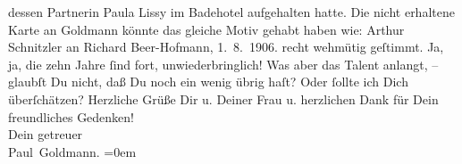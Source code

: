 \begin{ledgroupsized}[t]{13cm}
{{{                  dessen Partnerin Paula Lissy im Badehotel aufgehalten hatte. Die nicht
                  erhaltene Karte an Goldmann könnte das
                  gleiche Motiv gehabt haben wie: Arthur Schnitzler an Richard Beer-Hofmann, 1. 8. 1906.
               }}}\label{K_L03249-1h} recht wehmütig geſtimmt. Ja, ja, die zehn Jahre ſind fort, unwiederbringlich!
               Was aber das Talent anlangt, – glaubſt Du nicht, daß Du noch ein wenig übrig haſt?
               Oder ſollte ich Dich überſchätzen?\pend
           \pstart
           Herzliche Grüße Dir u. Deiner Frau u. herzlichen Dank für Dein freundliches Gedenken! {\\[\baselineskip]}Dein getreuer {\\[\baselineskip]}\spacefill\mbox{Paul Goldmann.}\pend
           \leftskip=0em{}
         
         \endnumbering{}\end{ledgroupsized}  \newcommand{\dateiname}{L03249}\newcommand{\titel}{Paul Goldmann an Arthur Schnitzler, 3. 8. 1906}\newcommand{\editorInnen}{Martin Anton Müller und Laura Untner}
      